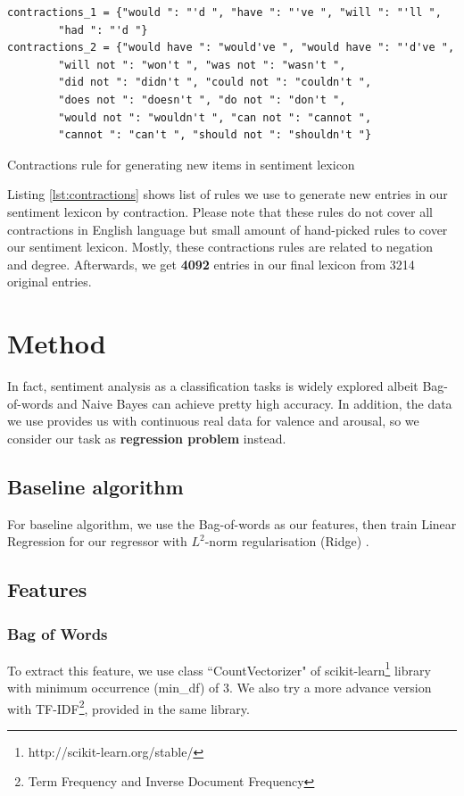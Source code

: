 \documentclass[12pt]{article}
\begin{document}
\begin{listing}[H]
	\begin{verbatim}
contractions_1 = {"would ": "'d ", "have ": "'ve ", "will ": "'ll ",
		"had ": "'d "}
contractions_2 = {"would have ": "would've ", "would have ": "'d've ",
		"will not ": "won't ", "was not ": "wasn't ",
		"did not ": "didn't ", "could not ": "couldn't ",
		"does not ": "doesn't ", "do not ": "don't ",
		"would not ": "wouldn't ", "can not ": "cannot ",
		"cannot ": "can't ", "should not ": "shouldn't "}
	\end{verbatim}
	\caption{Contractions rule for generating new items in sentiment lexicon}
	\label{lst:contractions}
\end{listing}

Listing \ref{lst:contractions} shows list of rules we use to generate new entries in our sentiment lexicon by contraction. Please note that these rules do not cover all contractions in English language but small amount of hand-picked rules to cover our sentiment lexicon. Mostly, these contractions rules are related to negation and degree. Afterwards, we get \textbf{4092} entries in our final lexicon from 3214 original entries.

\section{Method} \label{method}

In fact, sentiment analysis as a classification tasks is widely explored albeit Bag-of-words and Naive Bayes can achieve pretty high accuracy. In addition, the data we use provides us with continuous real data for valence and arousal, so we consider our task as \textbf{regression problem} instead.

\subsection{Baseline algorithm}
For baseline algorithm, we use the Bag-of-words as our features, then train Linear Regression for our regressor with $L^2$-norm regularisation (Ridge) \cite{preotiuc2016modelling}.

\subsection{Features}
\subsubsection{Bag of Words}
To extract this feature, we use class ``CountVectorizer" of scikit-learn\footnote{http://scikit-learn.org/stable/} library with minimum occurrence (min\_df) of 3. We also try a more advance version with TF-IDF\footnote{Term Frequency and Inverse Document Frequency}, provided in the same library.
\end{document}
